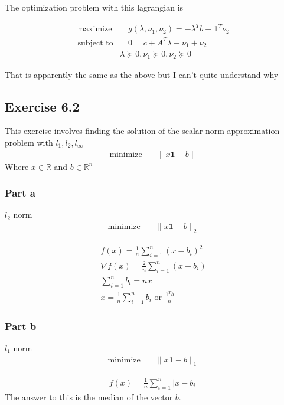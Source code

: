 The optimization problem with this lagrangian is 

\begin{align}
  \text{maximize} & \quad   g(\lambda, \nu_1, \nu_2) = -\lambda^T b - \textbf{1}^T \nu_2  \\
  \text{subject to} & \quad  0 =  c + A^T \lambda - \nu_1 + \nu_2 \\
  & \lambda \succeq 0, \nu_1 \succeq 0, \nu_2 \succeq 0 \quad 
\end{align}

That is apparently the same as the above but I can't quite understand why

\subsection{Exercise 6.2}
This exercise involves finding the solution of the scalar norm approximation problem with $l_1, l_2, l_\infty$
\begin{align}
  \text{minimize} & \quad \| x \textbf{1} - b \|
\end{align}
Where $x \in \mathbb{R}$ and $b \in \mathbb{R}^n$

\subsubsection{Part a}
$l_2$ norm
\begin{align}
  \text{minimize} & \quad \| x \textbf{1} - b \|_2
\end{align}


\begin{equation}
  \begin{aligned}
    f(x) = \frac{1}{n} \sum_{i=1}^n (x-b_i)^2 \\
    \nabla f(x) = \frac{2}{n}\sum_{i=1}^n (x-b_i) \\
    \sum_{i=1}^n b_i = nx \\ 
    x = \frac{1}{n} \sum_{i=1}^n b_i \text{ or } \frac{\textbf{1}^T b}{n}
  \end{aligned}
\end{equation}

\subsubsection{Part b}
$l_1$ norm
\begin{align}
  \text{minimize} & \quad \| x \textbf{1} - b \|_1
\end{align}


\begin{equation}
  \begin{aligned}
    f(x) = \frac{1}{n} \sum_{i=1}^n |x-b_i|
  \end{aligned}
\end{equation}
The answer to this is the median of the vector $b$.

